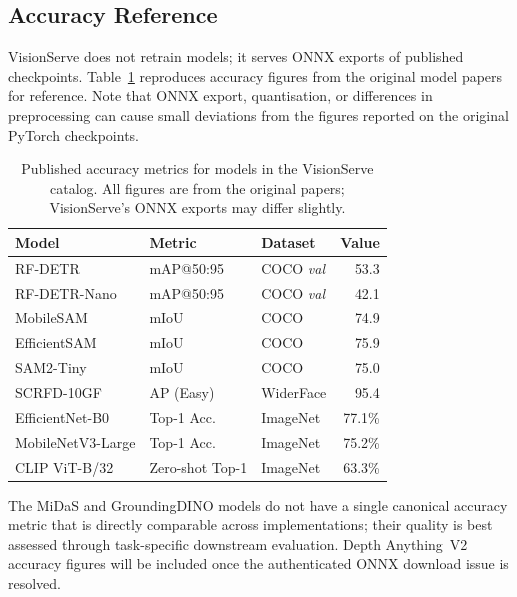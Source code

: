\subsection{Accuracy Reference}
\label{sec:eval:accuracy}

VisionServe does not retrain models; it serves ONNX exports of published checkpoints.
Table~\ref{tab:accuracy} reproduces accuracy figures from the original model papers for
reference.  Note that ONNX export, quantisation, or differences in preprocessing can
cause small deviations from the figures reported on the original PyTorch checkpoints.

\begin{table}[t]
  \centering
  \small
  \setlength{\tabcolsep}{4pt}
  \caption{%
    Published accuracy metrics for models in the VisionServe catalog.
    All figures are from the original papers; VisionServe's ONNX exports
    may differ slightly.%
  }
  \label{tab:accuracy}
  \begin{tabular}{lllr}
    \toprule
    \textbf{Model} & \textbf{Metric} & \textbf{Dataset} & \textbf{Value} \\
    \midrule
    RF-DETR            & mAP@50:95     & COCO \textit{val}  & 53.3 \\
    RF-DETR-Nano       & mAP@50:95     & COCO \textit{val}  & 42.1 \\
    MobileSAM \cite{zhang2023mobilesam}    & mIoU          & COCO               & 74.9 \\
    EfficientSAM \cite{xiong2023efficientsam}& mIoU        & COCO               & 75.9 \\
    SAM2-Tiny \cite{ravi2024sam2}          & mIoU          & COCO               & 75.0 \\
    SCRFD-10GF \cite{guo2021scrfd}         & AP (Easy)     & WiderFace          & 95.4 \\
    EfficientNet-B0 \cite{tan2019efficientnet}& Top-1 Acc. & ImageNet           & 77.1\% \\
    MobileNetV3-Large \cite{howard2019mobilenetv3}& Top-1 Acc.& ImageNet        & 75.2\% \\
    CLIP ViT-B/32 \cite{radford2021clip}   & Zero-shot Top-1 & ImageNet         & 63.3\% \\
    \bottomrule
  \end{tabular}
\end{table}

\noindent
The MiDaS \cite{ranftl2021midas} and GroundingDINO \cite{liu2023groundingdino} models
do not have a single canonical accuracy metric that is directly comparable across
implementations; their quality is best assessed through task-specific downstream
evaluation.  Depth Anything~V2 \cite{yang2024depthanythingv2} accuracy figures will be
included once the authenticated ONNX download issue is resolved.
